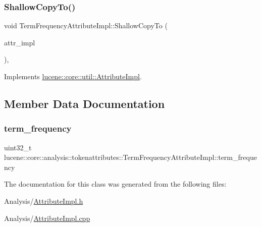 \subsubsection{\texorpdfstring{Shallow\+Copy\+To()}{ShallowCopyTo()}}
{\footnotesize\ttfamily void Term\+Frequency\+Attribute\+Impl\+::\+Shallow\+Copy\+To (\begin{DoxyParamCaption}\item[{\mbox{\hyperlink{classlucene_1_1core_1_1util_1_1AttributeImpl}{lucene\+::core\+::util\+::\+Attribute\+Impl}} \&}]{attr\+\_\+impl }\end{DoxyParamCaption})\hspace{0.3cm}{\ttfamily [override]}, {\ttfamily [virtual]}}



Implements \mbox{\hyperlink{classlucene_1_1core_1_1util_1_1AttributeImpl_a010e8937832f53139c8fe42757476895}{lucene\+::core\+::util\+::\+Attribute\+Impl}}.



\subsection{Member Data Documentation}
\mbox{\label{classlucene_1_1core_1_1analysis_1_1tokenattributes_1_1TermFrequencyAttributeImpl_a94d743632e8edd5e9e05ce039eec16e8}} 
\subsubsection{\texorpdfstring{term\+\_\+frequency}{term\_frequency}}
{\footnotesize\ttfamily uint32\+\_\+t lucene\+::core\+::analysis\+::tokenattributes\+::\+Term\+Frequency\+Attribute\+Impl\+::term\+\_\+frequency\hspace{0.3cm}{\ttfamily [private]}}



The documentation for this class was generated from the following files\+:\begin{DoxyCompactItemize}
\item 
Analysis/\mbox{\hyperlink{AttributeImpl_8h}{Attribute\+Impl.\+h}}\item 
Analysis/\mbox{\hyperlink{AttributeImpl_8cpp}{Attribute\+Impl.\+cpp}}\end{DoxyCompactItemize}
